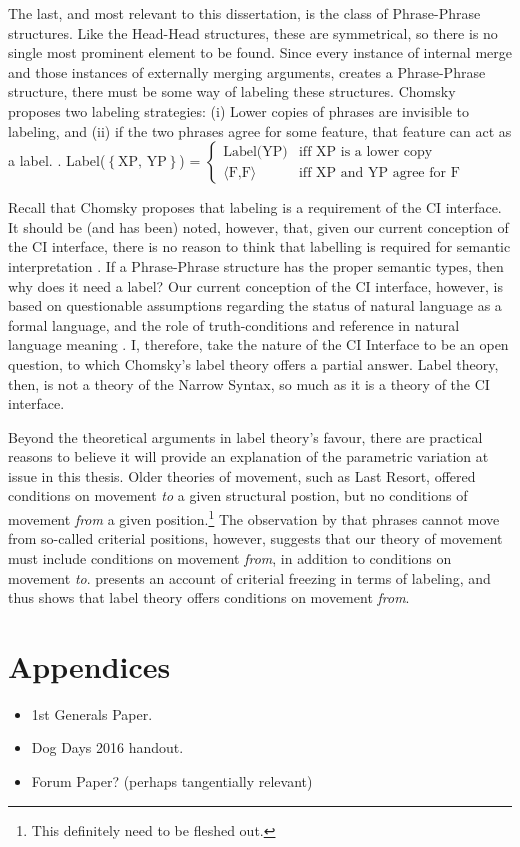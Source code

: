 \documentclass[letterpaper,12pt]{article}
\newcommand{\xpyp}{$\left\{ \text{XP, YP} \right\}$}
\begin{document}
The last, and most relevant to this dissertation, is the class of Phrase-Phrase structures.
Like the Head-Head structures, these are symmetrical, so there is no single most prominent element to be found.
Since every instance of internal merge and those instances of externally merging arguments, creates a Phrase-Phrase structure, there must be some way of labeling these structures.
Chomsky proposes two labeling strategies: (i) Lower copies of phrases are invisible to labeling, and (ii) if the two phrases agree for some feature, that feature can act as a label.
\ex. Label(\xpyp) = $
\begin{cases}
  \text{Label(YP)} & \text{iff XP is a lower copy}\\
  \langle\text{F,F}\rangle & \text{iff XP and YP agree for F}
\end{cases}
$

Recall that Chomsky proposes that labeling is a requirement of the CI interface.
It should be (and has been) noted, however, that, given our current conception of the CI interface, there is no reason to think that labelling is required for semantic interpretation \parencite[see \textit{e.g.,}][]{hornstein2016arizona}.
If a Phrase-Phrase structure has the proper semantic types, then why does it need a label?
Our current conception of the CI interface, however, is based on questionable assumptions regarding the status of natural language as a formal language, and the role of truth-conditions and reference in natural language meaning \parencite{chomsky2000new,pietroski2005events,moravcsik1998meaning}.
I, therefore, take the nature of the CI Interface to be an open question, to which Chomsky's label theory offers a partial answer.
Label theory, then, is not a theory of the Narrow Syntax, so much as it is a theory of the CI interface.

Beyond the theoretical arguments in label theory's favour, there are practical reasons to believe it will provide an explanation of the parametric variation at issue in this thesis.
Older theories of movement, such as Last Resort, offered conditions on movement \textit{to} a given structural postion, but no conditions of movement \textit{from} a given position.\footnote{This definitely need to be fleshed out.}
The observation by \textcite[][and elsewhere]{rizzi2015notes} that phrases cannot move from so-called criterial positions, however, suggests that our theory of movement must include conditions on movement \textit{from}, in addition to conditions on movement \textit{to}.
\textcite{chomsky2015problems} presents an account of criterial freezing in terms of labeling, and thus shows that label theory offers conditions on movement \textit{from}.


\section{Appendices}
\begin{itemize}
  \item 1st Generals Paper.
  \item Dog Days 2016 handout.
  \item Forum Paper? (perhaps tangentially relevant)
\end{itemize}
\printbibliography
\end{document}
